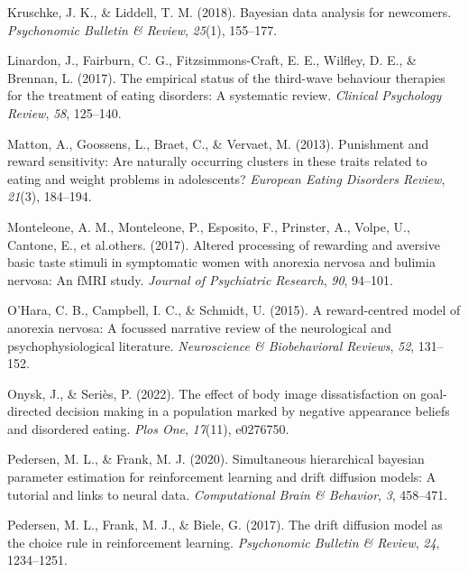 \documentclass[
  man,floatsintext]{apa6}
\newlength{\cslhangindent}
\newlength{\cslentryspacingunit} %
\newenvironment{CSLReferences}[2] %
 {%
  \setlength{\parindent}{0pt}
  \ifodd #1
  \let\oldpar\par
  \def\par{\hangindent=\cslhangindent\oldpar}
  \fi
  \setlength{\parskip}{#2\cslentryspacingunit}
 }%
 {}
\begin{document}
\begin{CSLReferences}{1}{0}
\leavevmode{}%
Kruschke, J. K., \& Liddell, T. M. (2018). Bayesian data analysis for newcomers. \emph{Psychonomic Bulletin \& Review}, \emph{25}(1), 155--177.

\leavevmode{}%
Linardon, J., Fairburn, C. G., Fitzsimmons-Craft, E. E., Wilfley, D. E., \& Brennan, L. (2017). The empirical status of the third-wave behaviour therapies for the treatment of eating disorders: A systematic review. \emph{Clinical Psychology Review}, \emph{58}, 125--140.

\leavevmode{}%
Matton, A., Goossens, L., Braet, C., \& Vervaet, M. (2013). Punishment and reward sensitivity: Are naturally occurring clusters in these traits related to eating and weight problems in adolescents? \emph{European Eating Disorders Review}, \emph{21}(3), 184--194.

\leavevmode{}%
Monteleone, A. M., Monteleone, P., Esposito, F., Prinster, A., Volpe, U., Cantone, E., et al.others. (2017). Altered processing of rewarding and aversive basic taste stimuli in symptomatic women with anorexia nervosa and bulimia nervosa: An fMRI study. \emph{Journal of Psychiatric Research}, \emph{90}, 94--101.

\leavevmode{}%
O'Hara, C. B., Campbell, I. C., \& Schmidt, U. (2015). A reward-centred model of anorexia nervosa: A focussed narrative review of the neurological and psychophysiological literature. \emph{Neuroscience \& Biobehavioral Reviews}, \emph{52}, 131--152.

\leavevmode{}%
Onysk, J., \& Seriès, P. (2022). The effect of body image dissatisfaction on goal-directed decision making in a population marked by negative appearance beliefs and disordered eating. \emph{Plos One}, \emph{17}(11), e0276750.

\leavevmode{}%
Pedersen, M. L., \& Frank, M. J. (2020). Simultaneous hierarchical bayesian parameter estimation for reinforcement learning and drift diffusion models: A tutorial and links to neural data. \emph{Computational Brain \& Behavior}, \emph{3}, 458--471.

\leavevmode{}%
Pedersen, M. L., Frank, M. J., \& Biele, G. (2017). The drift diffusion model as the choice rule in reinforcement learning. \emph{Psychonomic Bulletin \& Review}, \emph{24}, 1234--1251.


\end{CSLReferences}
\end{document}
